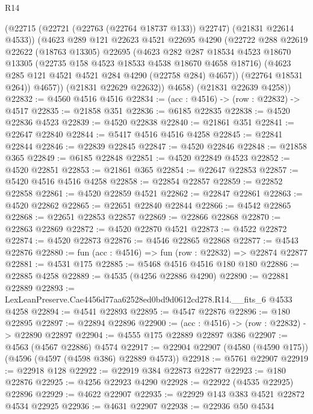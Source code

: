 \begin{lexlean}{R14}
\begin{coremodule}
            (@22715 (@22721 (@22763 (@22764 @18737 @133)) @22747) (@21831 @22614 @4533))
            (@4623
              @289
              @121
              @22623
              @4521
              @22695
              @4290
              (@22722
                @288
                @22619
                @22622
                (@18763 @13305)
                @22695
                (@4623
                  @282
                  @287
                  @18534
                  @4523
                  @18670
                  @13305
                  (@22735 @158 @4523 @18533 @4538 @18670 @4658 @18716)
                  (@4623 @285 @121 @4521 @4521 @284 @4290 (@22758 @284) @4657))
                (@22764 @18531 @264))
              @4657))
          (@21831 @22629 @22632))
        @4658)
      (@21831 @22639 @4258))
@22832 := @4560 @4516 @4516
@22834 := (acc : @4516) -> (row : @22832) -> @4517
@22835 := @21858 @351
@22836 := @6185 @22835
@22838 := @4520 @22836 @4523
@22839 := @4520 @22838
@22840 := @21861 @351
@22841 := @22647 @22840
@22844 := @5417 @4516 @4516 @4258
@22845 := @22841 @22844
@22846 := @22839 @22845
@22847 := @4520 @22846
@22848 := @21858 @365
@22849 := @6185 @22848
@22851 := @4520 @22849 @4523
@22852 := @4520 @22851
@22853 := @21861 @365
@22854 := @22647 @22853
@22857 := @5420 @4516 @4516 @4258
@22858 := @22854 @22857
@22859 := @22852 @22858
@22861 := @4520 @22859 @4521
@22862 := @22847 @22861
@22863 := @4520 @22862
@22865 := @22651 @22840 @22844
@22866 := @4542 @22865
@22868 := @22651 @22853 @22857
@22869 := @22866 @22868
@22870 := @22863 @22869
@22872 := @4520 @22870 @4521
@22873 := @4522 @22872
@22874 := @4520 @22873
@22876 := @4546 @22865 @22868
@22877 := @4543 @22876
@22880 := fun (acc : @4516) => fun (row : @22832) => @22874 @22877
@22881 := @4531 @175
@22885 := @5468 @4516 @4516 @180 @180
@22886 := @22885 @4258
@22889 := @4535 (@4256 @22886 @4290)
@22890 := @22881 @22889
@22893 := LexLeanPreserve.Cae4456d77aa62528ed0bd9d0612cd278.R14.__fits_6 @4533 @4258
@22894 := @4541 @22893
@22895 := @4547 @22876
@22896 := @180 @22895
@22897 := @22894 @22896
@22900 := (acc : @4516) -> (row : @22832) -> @22890 @22897
@22904 := @4555 @175 @22889 @22897 @386
@22907 := @4563 (@4567 @22886) @4574
@22917 := @22904 @22907 (@4580 (@4590 @175)) (@4596 (@4597 (@4598 @386) @22889 @4573))
@22918 := @5761 @22907
@22919 := @22918 @128
@22922 := @22919 @384 @22873 @22877
@22923 := @180 @22876
@22925 := @4256 @22923 @4290
@22928 := @22922 (@4535 @22925) @22896
@22929 := @4622 @22907
@22935 := @22929 @143 @383 @4521 @22872 @4534 @22925
@22936 := @4631 @22907
@22938 := @22936 @50 @4534

\end{coremodule}
\end{lexlean}
